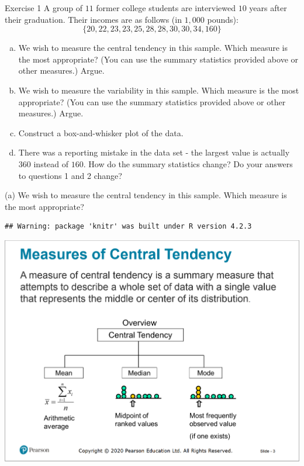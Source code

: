 \documentclass[
  11pt,
  ignorenonframetext,
]{beamer}
\begin{document}
\begin{frame}{Exercise 1}
\protect\hypertarget{exercise-1-1}{}
A group of \(11\) former college students are interviewed \(10\) years
after their graduation. Their incomes are as follows (in \(1,000\)
pounds): \[
\{20, 22, 23, 23, 25, 28, 28, 30, 30, 34, 160\}
\]

\begin{enumerate}
[a.]
\item
  We wish to measure the central tendency in this sample. Which measure
  is the most appropriate? (You can use the summary statistics provided
  above or other measures.) Argue.
\item
  We wish to measure the variability in this sample. Which measure is
  the most appropriate? (You can use the summary statistics provided
  above or other measures.) Argue.
\item
  Construct a box-and-whisker plot of the data.
\item
  There was a reporting mistake in the data set - the largest value is
  actually \(360\) instead of \(160\). How do the summary statistics
  change? Do your answers to questions 1 and 2 change?
\end{enumerate}
\end{frame}

\begin{frame}[fragile]{(a) We wish to measure the central tendency in
this sample. Which measure is the most appropriate?}
\protect\hypertarget{a-we-wish-to-measure-the-central-tendency-in-this-sample.-which-measure-is-the-most-appropriate}{}
\pause

\begin{verbatim}
## Warning: package 'knitr' was built under R version 4.2.3
\end{verbatim}

\begin{center}\includegraphics[width=0.8\linewidth]{pictures/Central Tendency} \end{center}
\end{frame}
\end{document}

